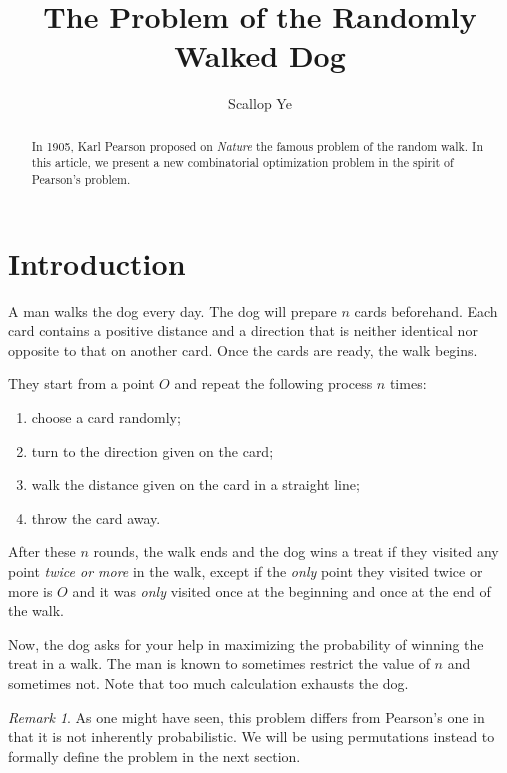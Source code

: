 \documentclass{amsart}
\title{The Problem of the Randomly Walked Dog}
\author{Scallop Ye}
\theoremstyle{definition}
\theoremstyle{problem}
\theoremstyle{remark}
\newtheorem*{remark}{Remark}
\begin{document}
\begin{abstract}
    In 1905, Karl Pearson \cite{pearson} proposed on \emph{Nature} the
    famous problem of the random walk. In this article, we present a new
    combinatorial optimization problem in the spirit of Pearson's problem.
\end{abstract}

\maketitle

\section{Introduction}

A man walks the dog every day. The dog will prepare $n$ cards beforehand.
Each card contains a positive distance and a direction that is neither identical
nor opposite to that on another card. Once the cards are ready, the walk begins.

They start from a point $O$ and repeat the following process $n$ times:

\begin{enumerate}
    \item choose a card randomly;
    \item turn to the direction given on the card;
    \item walk the distance given on the card in a straight line;
    \item throw the card away.
\end{enumerate}

After these $n$ rounds, the walk ends and the dog wins a treat if they visited
any point \emph{twice or more} in the walk, except if the \emph{only} point
they visited twice or more is $O$ and it was \emph{only} visited once at the
beginning and once at the end of the walk.

Now, the dog asks for your help in maximizing the probability of winning the
treat in a walk. The man is known to sometimes restrict the value of $n$ and
sometimes not. Note that too much calculation exhausts the dog.

\begin{remark}
    As one might have seen, this problem differs from Pearson’s one in that
    it is not inherently probabilistic. We will be using permutations
    instead to formally define the problem in the next section.
\end{remark}
\end{document}
